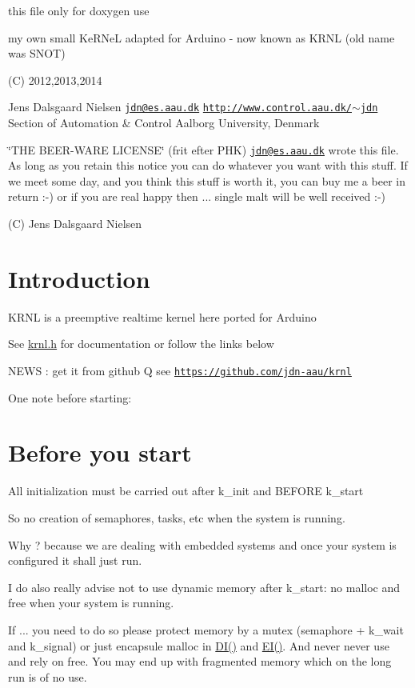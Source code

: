 this file only for doxygen use

my own small Ke\+R\+Ne\+L adapted for Arduino -\/ now known as K\+R\+N\+L (old name was S\+N\+O\+T)

(C) 2012,2013,2014

Jens Dalsgaard Nielsen \href{mailto:jdn@es.aau.dk}{\tt jdn@es.\+aau.\+dk} \href{http://www.control.aau.dk/~jdn}{\tt http\+://www.\+control.\+aau.\+dk/$\sim$jdn} Section of Automation \& Control Aalborg University, Denmark

\char`\"{}\+T\+H\+E B\+E\+E\+R-\/\+W\+A\+R\+E L\+I\+C\+E\+N\+S\+E\char`\"{} (frit efter P\+H\+K) \href{mailto:jdn@es.aau.dk}{\tt jdn@es.\+aau.\+dk} wrote this file. As long as you retain this notice you can do whatever you want with this stuff. If we meet some day, and you think this stuff is worth it, you can buy me a beer in return \+:-\/) or if you are real happy then ... single malt will be well received \+:-\/)

(C) Jens Dalsgaard Nielsen\hypertarget{index_Introduction}{}\section{Introduction}\label{index_Introduction}
K\+R\+N\+L is a preemptive realtime kernel here ported for Arduino

See \hyperlink{krnl_8h}{krnl.\+h} for documentation or follow the links below

N\+E\+W\+S \+: get it from github Q see \href{https://github.com/jdn-aau/krnl}{\tt https\+://github.\+com/jdn-\/aau/krnl}

One note before starting\+:\hypertarget{index_a1}{}\section{Before you start}\label{index_a1}
All initialization must be carried out after k\+\_\+init and B\+E\+F\+O\+R\+E k\+\_\+start

So no creation of semaphores, tasks, etc when the system is running.

Why ? because we are dealing with embedded systems and once your system is configured it shall just run.

I do also really advise not to use dynamic memory after k\+\_\+start\+: no malloc and free when your system is running.

If ... you need to do so please protect memory by a mutex (semaphore + k\+\_\+wait and k\+\_\+signal) or just encapsule malloc in \hyperlink{krnl_8h_a7339898dcc9ad3b952a63479a4d6eb98}{D\+I()} and \hyperlink{krnl_8h_a9180679bb516152437cbc6e91dc21a6f}{E\+I()}. And never never use and rely on free. You may end up with fragmented memory which on the long run is of no use.

